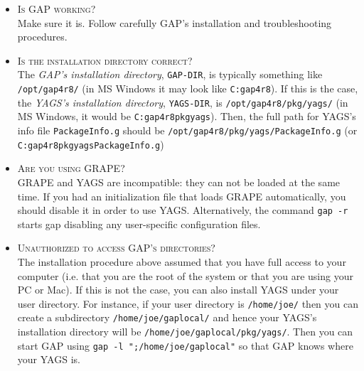 \documentclass[a4paper,11pt]{report}
\begin{document}
{{\begin{itemize}
\item \textsc{Is }\textsf{GAP}\textsc{ working?}\\
 Make sure it is. Follow carefully \textsf{GAP}'s installation and troubleshooting procedures. 
\item \textsc{Is the installation directory correct?}\\
 The \emph{\textsf{GAP}'s installation directory}, \texttt{GAP-DIR},   is typically something like \texttt{/opt/gap4r8/} (in MS Windows it may look like \texttt{C:\texttt{}gap4r8\texttt{}}). If this is the case, the \emph{\textsf{YAGS}'s installation directory}, \texttt{YAGS-DIR}, is   \texttt{/opt/gap4r8/pkg/yags/} (in MS Windows, it would be \texttt{C:\texttt{}gap4r8\texttt{}pkg\texttt{}yags\texttt{}}). Then, the full path for \textsf{YAGS}'s info file \texttt{PackageInfo.g} should be \texttt{/opt/gap4r8/pkg/yags/PackageInfo.g} (or \texttt{C:\texttt{}gap4r8\texttt{}pkg\texttt{}yags\texttt{}PackageInfo.g}) 
\item \textsc{Are you using }\textsf{GRAPE}\textsc{?}\\
 \textsf{GRAPE} and \textsf{YAGS} are incompatible: they can not be loaded at the same time. If you had an
initialization file that loads \textsf{GRAPE} automatically, you should disable it in order to use \textsf{YAGS}. Alternatively, the command \texttt{gap -r} starts gap disabling any user-specific configuration files. 
\item \textsc{Unauthorized to access }\textsf{GAP}\textsc{'s directories?}\\
 The installation procedure above assumed that you have full access to your
computer (i.e. that you are the root of the system or that you are using your
PC or Mac). If this is not the case, you can also install \textsf{YAGS} under your user directory. For instance, if your user directory is \texttt{/home/joe/} then you can create a subdirectory \texttt{/home/joe/gaplocal/} and hence your \textsf{YAGS}'s installation directory will be \texttt{/home/joe/gaplocal/pkg/yags/}. Then you can start \textsf{GAP} using \texttt{gap -l ";/home/joe/gaplocal"} so that \textsf{GAP} knows where your \textsf{YAGS} is. 
\end{itemize}
 }

}
\end{document}
